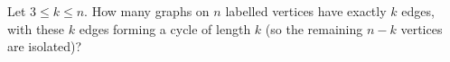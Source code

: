 Let $3\le k\le n$. How many graphs on $n$ labelled vertices have exactly $k$ edges, with these $k$ edges forming a cycle of length $k$ (so the remaining $n-k$ vertices are isolated)?

